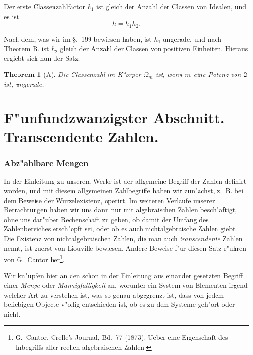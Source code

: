 \documentclass[10pt,a4paper]{article}
\theoremstyle{weberstyle}
\newtheorem{theorem}{Theorem}[section]
\begin{document}
Der erste Classenzahlfactor $h_1$ ist gleich der Anzahl der Classen von
Idealen, und es ist
\begin{equation}\label{eq:202.3}
h = h_1 h_2.
\end{equation}

Nach dem, was wir im \S.~199 bewiesen haben, ist $h_1$ ungerade, und nach
Theorem B. ist $h_2$ gleich der Anzahl der Classen von positiven
Einheiten. Hieraus ergiebt sich nun der Satz:

\begin{theorem}[A]
Die Classenzahl im K"orper $\Omega_m$ ist, wenn $m$ eine Potenz von $2$
ist, ungerade.
\end{theorem}

\newpage

%
%
\part*{F"unfundzwanzigster Abschnitt.\\Transcendente Zahlen.}

%
%
\section{Abz"ahlbare Mengen}\label{sec:203}

In der Einleitung zu unserem Werke ist der allgemeine Begriff der Zahlen
definirt worden, und mit diesem allgemeinen Zahlbegriffe haben wir
zun"achst, z.~B. bei dem Beweise der Wurzelexistenz, operirt. Im weiteren
Verlaufe unserer Betrachtungen haben wir uns dann nur mit algebraischen
Zahlen besch"aftigt, ohne uns dar"uber Rechenschaft zu geben, ob damit der
Umfang des Zahlenbereiches ersch"opft sei, oder ob es auch
nichtalgebraische Zahlen giebt. Die Existenz von nichtalgebraischen
Zahlen, die man auch \emph{transcendente} Zahlen nennt, ist zuerst von
Liouville bewiesen. Andere Beweise f"ur diesen Satz r"uhren von
G.~Cantor her\footnote{G.~Cantor, Crelle's Journal, Bd.~77 (1873).
Ueber eine Eigenschaft des Inbegriffs aller reellen algebraischen Zahlen.}.

Wir kn"upfen hier an den schon in der Einleitung aus einander gesetzten
Begriff einer \emph{Menge} oder \emph{Mannigfaltigkeit} an, worunter ein
System von Elementen irgend welcher Art zu verstehen ist, was so genau
abgegrenzt ist, dass von jedem beliebigen Objecte v"ollig entschieden ist,
ob es zu dem Systeme geh"ort oder nicht.
\end{document}
